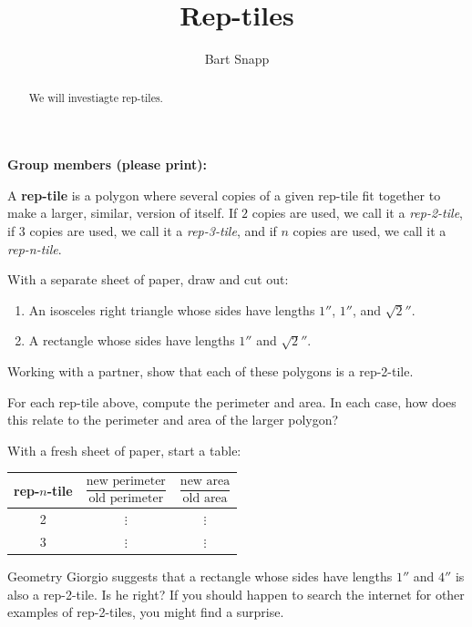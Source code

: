 \documentclass[handout,nooutcomes,noauthor]{ximera}
\title{Rep-tiles}
\author{Bart Snapp}
\begin{document}
\begin{abstract}
  We will investiagte rep-tiles.
\end{abstract}
\maketitle

\noindent\textbf{Group members (please print):}\ \hrulefill \\

\hrulefill


A \textbf{rep-tile} is a polygon where several copies of
a given rep-tile fit together to make a larger, similar, version of
itself. If $2$ copies are used, we call it a \textit{rep-2-tile}, if
$3$ copies are used, we call it a \textit{rep-3-tile}, and if $n$ copies
are used, we call it a \textit{rep-n-tile}.


\begin{problem}
With a separate sheet of paper, draw and cut out:
\begin{enumerate}
\item An isosceles right triangle whose sides have lengths $1''$, $1''$, and $\sqrt{2}''$.
\item A rectangle whose sides have lengths $1''$ and $\sqrt{2}''$.
\end{enumerate}
Working with a partner, show that each of these polygons is a rep-2-tile.
\end{problem}

\begin{problem}
For each rep-tile above, compute the perimeter and area. In each case,
how does this relate to the perimeter and area of the larger polygon?
\end{problem}


\begin{problem}
With a fresh sheet of paper, start a table:
\begin{center}
\begin{tabular}{c|c|c}
rep-$n$-tile & $\dfrac{\text{new perimeter}}{\text{old perimeter}}$ & $\dfrac{\text{new area}}{\text{old area}}$  \\
\hline\hline
 2 & $\vdots$  &  $\vdots$  \\ 
3 & $\vdots$  &  $\vdots$  \\ 
\end{tabular}
\end{center}
\end{problem}


\begin{problem}
Geometry Giorgio suggests that a rectangle whose sides have lengths
$1''$ and $4''$ is also a rep-2-tile. Is he right? If you should
happen to search the internet for other examples of rep-2-tiles, you
might find a surprise.
\end{problem}
\end{document}
